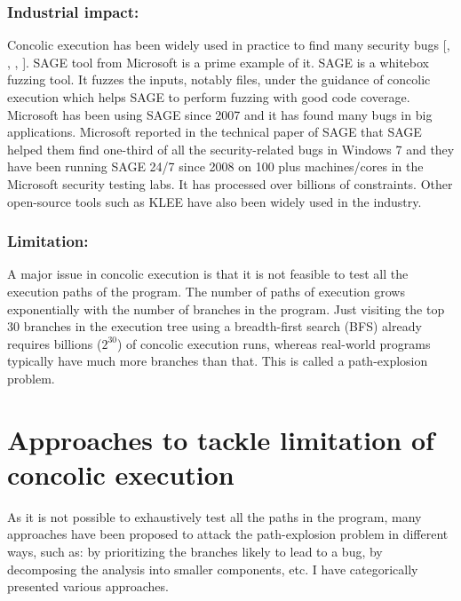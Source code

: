 \documentclass[ runningheads,
               a4paper]{llncs}
\begin{document}
\subsubsection{Industrial impact:}
Concolic execution has been widely used in practice to find many security bugs [\cite{godefroid2008automated}, \cite{kim2020hfl}, \cite{kim2022fuzzusb}, \cite{pham2016model}]. SAGE \cite{godefroid2012sage} tool from Microsoft is a prime example of it. SAGE is a whitebox fuzzing tool. It fuzzes the inputs, notably files,
under the guidance of concolic execution which helps SAGE to perform fuzzing with good code coverage. Microsoft has been using SAGE since 2007 and it has found many bugs in big applications. Microsoft reported in the technical paper of SAGE \cite{godefroid2012sage} that SAGE helped them find one-third of all the security-related bugs in Windows 7 and they have been running SAGE 24/7 since 2008 on 100 plus machines/cores in the Microsoft security testing labs. It has processed over billions of constraints. Other open-source tools such as KLEE \cite{cadar2008klee} have also been widely used in the industry.


\subsubsection{Limitation:}
A major issue in concolic execution is that it is not feasible to test all the execution paths of the program. The number of paths of execution grows exponentially with the number of branches in the program. Just visiting the top 30 branches in the execution tree using a breadth-first search (BFS) already requires billions (\(2^{30}\)) of concolic execution runs, whereas real-world programs typically have much more branches than that. This is called a path-explosion problem.






\section{Approaches to tackle limitation of concolic execution}
As it is not possible to exhaustively test all the paths in the program, many approaches have been proposed \cite{sabbaghi2020systematic} to attack the path-explosion problem in different ways, such as: by prioritizing the branches likely to lead to a bug, by decomposing the analysis into smaller components, etc. I have categorically presented various approaches.
\end{document}
